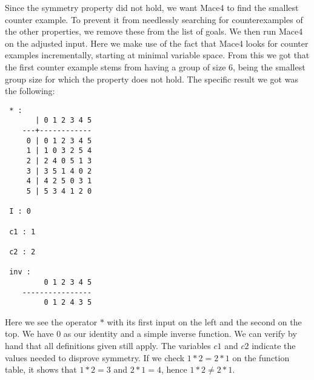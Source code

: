 Since the symmetry property did not hold, we want Mace4 to find the smallest counter example. To prevent it from needlessly searching for counterexamples of the other properties, we remove these from the list of goals. We then run Mace4 on the adjusted input. Here we make use of the fact that Mace4 looks for counter examples incrementally, starting at minimal variable space. From this we got that the first counter example stems from having a group of size $6$, being the smallest group size for which the property does not hold. The specific result we got was the following:\\
\begin{verbatim}
 * : 
       | 0 1 2 3 4 5
    ---+------------
     0 | 0 1 2 3 4 5
     1 | 1 0 3 2 5 4
     2 | 2 4 0 5 1 3
     3 | 3 5 1 4 0 2
     4 | 4 2 5 0 3 1
     5 | 5 3 4 1 2 0

 I : 0

 c1 : 1

 c2 : 2

 inv : 
         0 1 2 3 4 5
    ----------------
         0 1 2 4 3 5
\end{verbatim}
Here we see the operator $*$ with its first input on the left and the second on the top. We have $0$ as our identity and a simple inverse function. We can verify by hand that all definitions given still apply. The variables $c1$ and $c2$ indicate the values needed to disprove symmetry. If we check $1*2 = 2*1$ on the function table, it shows that $1*2 = 3$ and $2*1=4$, hence $1*2 \neq 2*1$.

